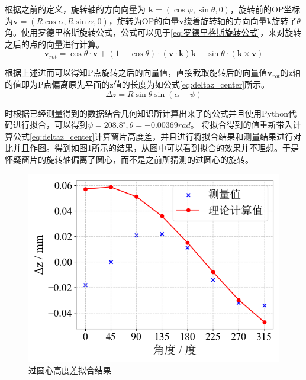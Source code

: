 \documentclass[master]{thesis-uestc}
\begin{document}
根据之前的定义，旋转轴的方向向量为 \(\mathbf{k} = (\cos\psi, \sin \theta, 0)\)，旋转前的OP坐标为\(\mathbf{v} = (R\cos \alpha, R\sin \alpha, 0)\)，旋转为OP的向量$\mathbf{v}$绕着旋转轴的方向向量\(\mathbf{k}\)旋转了\(\theta \)角。使用罗德里格斯旋转公式，公式可以见于\ref{eq:罗德里格斯旋转公式}，来对旋转之后的点的向量进行计算。
\begin{equation}\label{eq:罗德里格斯旋转公式}
    \mathbf{v}_{rot} = \cos\theta \cdot \mathbf{v} + (1 - \cos\theta) \cdot (\mathbf{v} \cdot \mathbf{k}) \mathbf{k} + \sin\theta \cdot (\mathbf{k} \times \mathbf{v})
\end{equation}

根据上述进而可以得知P点旋转之后的向量值，直接截取旋转后的向量值\(\mathbf{v}_{rot}\)的z轴的值即为P点偏离原先平面的z值的长度为如公式\ref{eq:deltaz_center}所示。
\begin{equation}\label{eq:deltaz_center}
    \Delta z = R \sin \theta \sin \left(\alpha -\psi \right)
\end{equation}

时根据已经测量得到的数据结合几何知识所计算出来了的公式并且使用Python代码进行拟合，可以得到\( \psi = 208.8 ^ \circ, \theta = -0.00369rad \)。
将拟合得到的值重新带入计算公式\ref{eq:deltaz_center}计算窗片高度差，并且进行将拟合结果和测量结果进行对比并且作图。得到如图\ref{fig:过圆心高度差拟合结果}所示的结果，从图中可以看到拟合的效果并不理想。于是怀疑窗片的旋转轴偏离了圆心，而不是之前所猜测的过圆心的旋转。
\begin{figure}[!htb]
    \centering
    \includegraphics[width=0.5\linewidth]{pic/chapter5/过圆心高度差拟合.png}
    \caption{过圆心高度差拟合结果}
    \label{fig:过圆心高度差拟合结果}
\end{figure}
\end{document}
